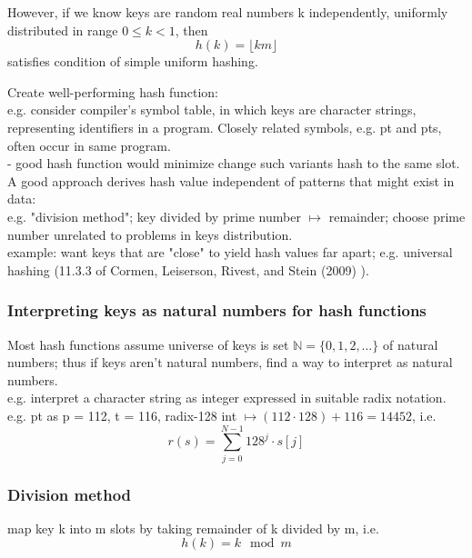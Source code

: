 \documentclass[10pt]{amsart}
\begin{document}
\begin{multicols*}{2}
However, if we know keys are random real numbers k independently, uniformly distributed in range $0\leq k < 1$, then
\begin{equation}
h(k) = \lfloor km \rfloor
\end{equation}
satisfies condition of simple uniform hashing.

Create well-performing hash function: \\
e.g. consider compiler's symbol table, in which keys are character strings, representing identifiers in a program. Closely related symbols, e.g. pt and pts, often occur in same program. \\
- good hash function would minimize change such variants hash to the same slot. \\

A good approach derives hash value independent of patterns that might exist in data: \\
e.g. "division method"; key divided by prime number $\mapsto$ remainder; choose prime number unrelated to problems in keys distribution. \\

example: want keys that are "close" to yield hash values far apart; e.g. universal hashing (11.3.3 of Cormen, Leiserson, Rivest, and Stein (2009) \cite{CLRS2009}).

\subsubsection{Interpreting keys as natural numbers for hash functions}

Most hash functions assume universe of keys is set $\mathbb{N} = \lbrace 0, 1,2, \dots \rbrace$ of natural numbers; thus if keys aren't natural numbers, find a way to interpret as natural numbers. \\
e.g. interpret a character string as integer expressed in suitable radix notation. \\
e.g. pt as p = 112, t = 116, radix-128 int $\mapsto (112 \cdot 128) + 116 = 14452$, i.e.
\[
r(s) = \sum_{j=0}^{N- 1} 128^j \cdot s[j]
\]

\subsubsection{Division method}

map key k into m slots by taking remainder of k divided by m, i.e. 
\begin{equation}
h(k) = k \mod{m}
\end{equation}


\end{multicols*}
\end{document}
